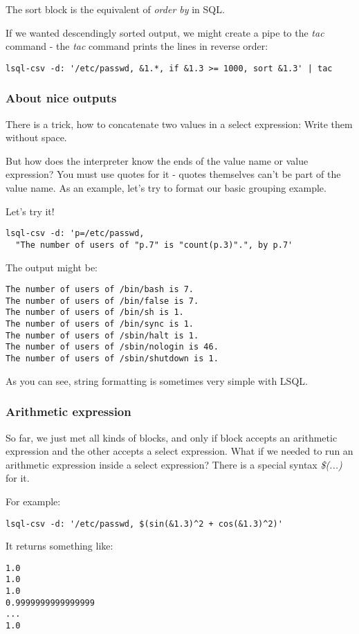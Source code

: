 The sort block is the equivalent of \textit{order by} in SQL.

If we wanted descendingly sorted output, we might create a pipe to the \textit{tac} command - the \textit{tac} command prints the lines in reverse order:
\begin{verbatim}
lsql-csv -d: '/etc/passwd, &1.*, if &1.3 >= 1000, sort &1.3' | tac
\end{verbatim}

\subsubsection{About nice outputs}
There is a trick, how to concatenate two values in a select expression: Write them without space.

But how does the interpreter know the ends of the value name or value expression? You must use quotes for it - quotes themselves can't be part of the value name.
As an example, let's try to format our basic grouping example.

Let's try it!
\begin{verbatim}
lsql-csv -d: 'p=/etc/passwd, 
  "The number of users of "p.7" is "count(p.3)".", by p.7'
\end{verbatim}
The output might be:
\begin{verbatim}
The number of users of /bin/bash is 7.
The number of users of /bin/false is 7.
The number of users of /bin/sh is 1.
The number of users of /bin/sync is 1.
The number of users of /sbin/halt is 1.
The number of users of /sbin/nologin is 46.
The number of users of /sbin/shutdown is 1.
\end{verbatim}

As you can see, string formatting is sometimes very simple with LSQL.

\subsubsection{Arithmetic expression}
So far, we just met all kinds of blocks, and only if block accepts an arithmetic expression and the other accepts a select expression.
What if we needed to run an arithmetic expression inside a select expression? There is a special syntax \textit{\$(...)} for it.

For example:
\begin{verbatim}
lsql-csv -d: '/etc/passwd, $(sin(&1.3)^2 + cos(&1.3)^2)'
\end{verbatim}

It returns something like:
\begin{verbatim}
1.0
1.0
1.0
0.9999999999999999
...
1.0
\end{verbatim}

